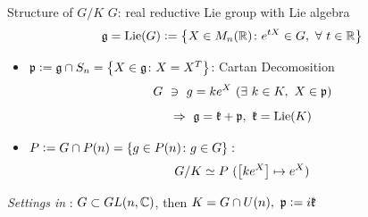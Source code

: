 \documentclass{beamer}
\begin{document}
	\begin{frame}{Structure of $G/K$}
		$G$: real reductive Lie group with Lie algebra
		\begin{equation*}
			\mathfrak{g} = \operatorname{Lie}(G) \vcentcolon= \left\{X \in M_n(\mathbb{R}) \colon e^{tX} \in G,~\forall~t \in \mathbb{R}\right\}		
		\end{equation*}
		\vspace{-1em}
		\begin{itemize}
			\item $\mathfrak{p} \vcentcolon= \mathfrak{g} \cap S_n = \left\{X \in \mathfrak{g} \colon X = X^T\right\}$: Cartan Decomosition
			\vspace{-0.5em}
			\begin{equation*}
				G~\ni~  g = ke^X ~(\exists~k\in K,~X \in \alg{p})
				\vspace{-0.5em}
			\end{equation*}
			\vspace{-1em}
			\begin{equation*}
				\Rightarrow~ \mathfrak{g} = \mathfrak{k} + \mathfrak{p},~\mathfrak{k} = \operatorname{Lie}(K)
			\end{equation*}
			\item $P \vcentcolon= G \cap P(n) = \left\{g \in P(n) \colon g \in G\right\}\colon $ 
			\vspace{-0.5em}
			\begin{equation*}
				G/K \simeq P ~(\bj{ke^X} \mapsto e^X)
				\vspace{-0.5em}
			\end{equation*}
		\end{itemize}
		\vspace{0.5em}
		\emph{Settings in} \cite{key8}: $G \subset GL(n,\mathbb{C})$, then $K = G \cap U(n),~\mathfrak{p} \vcentcolon= i\mathfrak{k}$
	\end{frame}
\end{document}

